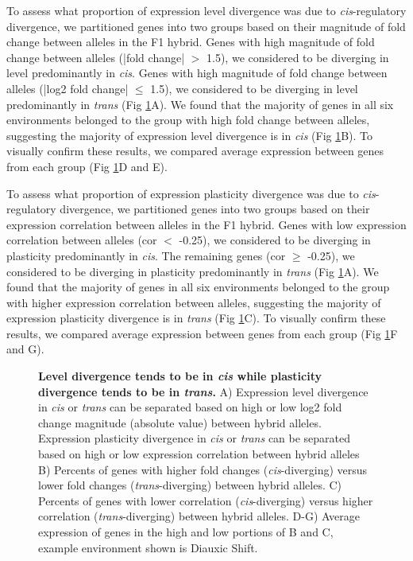 To assess what proportion of expression level divergence was due to \textit{cis}-regulatory divergence, we partitioned genes into two groups based on their magnitude of fold change between alleles in the F1 hybrid. Genes with high magnitude of fold change between alleles (|fold change| $>$ 1.5), we considered to be diverging in level predominantly in \textit{cis}. Genes with high magnitude of fold change between alleles (|log2 fold change| $\leq$ 1.5), we considered to be diverging in level predominantly in \textit{trans} (Fig \ref{fig:cistrans}A). We found that the majority of genes in all six environments belonged to the group with high fold change between alleles, suggesting the majority of expression level divergence is in \textit{cis} (Fig \ref{fig:cistrans}B). To visually confirm these results, we compared average expression between genes from each group (Fig \ref{fig:cistrans}D and E).

To assess what proportion of expression plasticity divergence was due to \textit{cis}-regulatory divergence, we partitioned genes into two groups based on their expression correlation between alleles in the F1 hybrid. Genes with low expression correlation between alleles (cor $<$ -0.25), we considered to be diverging in plasticity predominantly in \textit{cis}. The remaining genes (cor $\geq$ -0.25), we considered to be diverging in plasticity predominantly in \textit{trans} (Fig \ref{fig:cistrans}A). We found that the majority of genes in all six environments belonged to the group with higher expression correlation between alleles, suggesting the majority of expression plasticity divergence is in \textit{trans} (Fig \ref{fig:cistrans}C). To visually confirm these results, we compared average expression between genes from each group (Fig \ref{fig:cistrans}F and G).

\begin{figure}
    \centering
    \caption{\textbf{Level divergence tends to be in \textit{cis} while plasticity divergence tends to be in \textit{trans}.} A) Expression level divergence in \textit{cis} or \textit{trans} can be separated based on high or low log2 fold change magnitude (absolute value) between hybrid alleles. Expression plasticity divergence in \textit{cis} or \textit{trans} can be separated based on high or low expression correlation between hybrid alleles B) Percents of genes with higher fold changes (\textit{cis}-diverging) versus lower fold changes (\textit{trans}-diverging) between hybrid alleles. C) Percents of genes with lower correlation (\textit{cis}-diverging) versus higher correlation (\textit{trans}-diverging) between hybrid alleles. D-G) Average expression of genes in the high and low portions of B and C, example environment shown is Diauxic Shift.}
    \label{fig:cistrans}
\end{figure}


